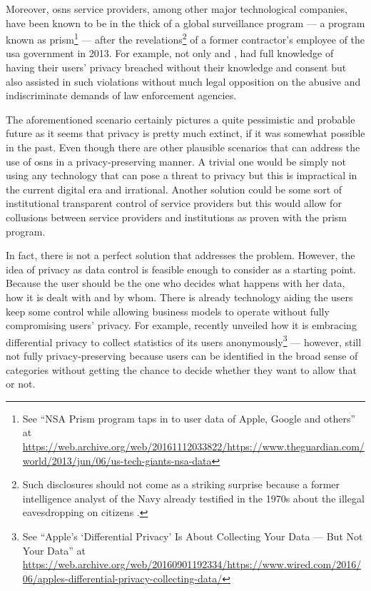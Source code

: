 Moreover, \acp{osn} service providers, among other major technological companies, 
have been known to be in the thick of a global surveillance program --- a program 
known as \Ac{prism}\footnote{See ``NSA Prism program taps in to user data of Apple, Google and others'' at \url{https://web.archive.org/web/20161112033822/https://www.theguardian.com/world/2013/jun/06/us-tech-giants-nsa-data}} --- 
after the revelations\footnote{Such disclosures should not come as a striking surprise 
because a former intelligence analyst of the  Navy already testified in 
the 1970s about the illegal eavesdropping on  citizens \cite{Bamford14}.} 
of a former contractor's employee of the \ac{usa} government in 2013. For example, 
not only \Facebook and \Google, had full knowledge of having their users' privacy 
breached without their knowledge and consent but also assisted in such violations 
without much legal opposition on the abusive and indiscriminate demands of law enforcement 
agencies.

The aforementioned scenario certainly pictures a quite pessimistic and probable 
future as it seems that privacy is pretty much extinct, if it was somewhat possible 
in the past. Even though there are other plausible scenarios that can address the 
use of \acp{osn} in a privacy-preserving manner. A trivial one would be simply not 
using any technology that can pose a threat to privacy but this is impractical in 
the current digital era and irrational. Another solution could be some sort of institutional 
transparent control of service providers but this would allow for collusions between 
service providers and institutions as proven with the \ac{prism} program.

In fact, there is not a perfect solution that addresses the problem. However, the 
idea of privacy as data control is feasible enough to consider as a starting point. 
Because the user should be the one who decides what happens with her data, how it 
is dealt with and by whom. There is already technology aiding the users keep some 
control while allowing business models to operate without fully compromising users' 
privacy. For example, \Apple recently unveiled how it is embracing differential 
privacy to collect statistics of its users anonymously\footnote{See ``Apple's `Differential Privacy' Is About Collecting Your Data --- But Not Your Data'' at \url{https://web.archive.org/web/20160901192334/https://www.wired.com/2016/06/apples-differential-privacy-collecting-data/}} 
--- however, still not fully privacy-preserving because users can be identified 
in the broad sense of categories without getting the chance to decide whether they 
want to allow that or not. 

